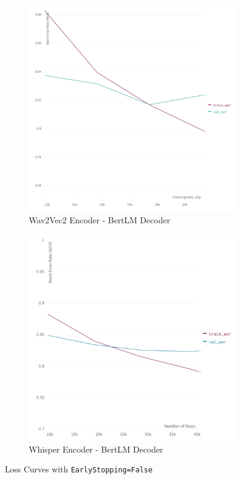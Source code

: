 \begin{figure}
     \begin{subfigure}[b]{0.48\textwidth}
         \includegraphics[width=\textwidth]{05-research study/figures/wav2vec2-bert-wer-graph.pdf}
         \caption{Wav2Vec2 Encoder - BertLM Decoder}
         \label{fig:wav2vec2-bert}
     \end{subfigure}
     \hfill
     \begin{subfigure}[b]{0.48\textwidth}
         \includegraphics[width=\textwidth]{05-research study/figures/whisper-bert-wer-graph.pdf}
         \caption{Whisper Encoder - BertLM Decoder}
         \label{fig:whisper-bert}
     \end{subfigure}
     \hfill
        \caption{Loss Curves with \texttt{EarlyStopping=False}}
        \label{fig:encoder-decoder-loss-curves}
\end{figure}

